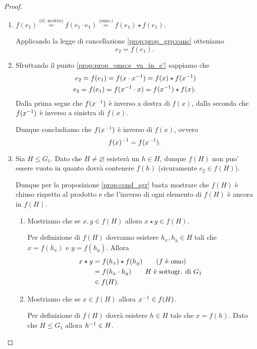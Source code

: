 \begin{proof}
    \begin{enumerate}[label={(\roman*)}]
        \item $f(e_1) \stackrel{\text{(el. neutro)}}{=} f(e_1 \cdot e_1) \stackrel{\text{(omo.)}}{=} f(e_1) \star f(e_1)$.
        
        Applicando la legge di cancellazione \ref{prop:prop_grp:canc} otteniamo \[
            e_2 = f(e_1).    
        \]
        \item Sfruttando il punto \ref{prop:prop_omo:e_va_in_e'} sappiamo che \begin{align*}
            e_2 = f(e_1) = f(x \cdot x^{-1}) = f(x)\star f(x^{-1}) \\
            e_2 = f(e_1) = f(x^{-1} \cdot x) = f(x^{-1})\star f(x).
        \end{align*} Dalla prima segue che $f(x^{-1})$ è inverso a destra di $f(x)$, dalla seconda che $f(x^{-1})$ è inverso a sinistra di $f(x)$.

        Dunque concludiamo che $f(x^{-1})$ è inverso di $f(x)$, ovvero \[
            f(x)^{-1} = f(x^{-1}).    
        \]
        \item Sia $H \leq G_1$. Dato che $H \neq \varnothing$ esisterà un $h \in H$, dunque $f(H)$ non puo' essere vuoto in quanto dovrà contenere $f(h)$ (sicuramente $e_2 \in f(H)$).
        
        Dunque per la proposizione \ref{prop:cond_sgr} basta mostrare che $f(H)$ è chiuso rispetto al prodotto e che l'inverso di ogni elemento di $f(H)$ è ancora in $f(H)$.

        \begin{enumerate}[label={(\arabic*)}]
            \item Mostriamo che se $x, y \in f(H)$ allora $x\star y \in f(H)$.
            
            Per definizione di $f(H)$ dovranno esistere $h_x, h_y \in H$ tali che $x = f(h_x)$ e $y = f(h_y)$. Allora \begin{align*}
                x\star y &= f(h_x)\star f(h_y) \tag*{\text{($f$ è omo)}}\\
                &= f(h_x \cdot h_y) \tag*{$H$ è sottogr. di $G_1$}\\
                &\in f(H).
            \end{align*}
            \item Mostriamo che se $x \in f(H)$ allora $x^{-1} \in f(H)$.
            
            Per definizione di $f(H)$ dovrà esistere $h \in H$ tale che $x = f(h)$. Dato che $H \leq G_1$ allora $h^{-1} \in H$.


\end{enumerate}
\end{enumerate}
\end{proof}

